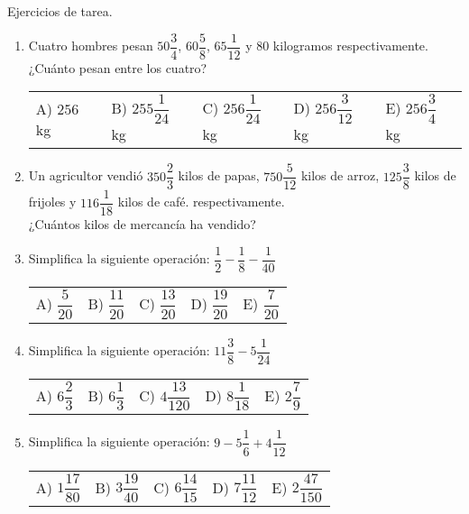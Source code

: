 \newpage

Ejercicios de tarea.

\begin{enumerate}
\item Cuatro hombres pesan $50 \dfrac{3}{4}$, $60 \dfrac{5}{8}$, $65 \dfrac{1}{12}$ y $80$ kilogramos respectivamente.
\\
¿Cuánto pesan entre los cuatro?
\begin{table}[H]
\large
\begin{tabular}{p{2.5cm} p{2.75cm} p{2.75cm} p{2.75cm} p{2.75cm}}
A) $256$ kg & B) $255 \dfrac{1}{24}$ kg & C) $256 \dfrac{1}{24}$ kg & D) $256 \dfrac{3}{12}$ kg & E) $256 \dfrac{3}{4}$ kg \\
\end{tabular}
\end{table}
\item Un agricultor vendió  $350 \dfrac{2}{3}$ kilos de papas, $750 \dfrac{5}{12}$ kilos de arroz, $125 \dfrac{3}{8}$ kilos de frijoles y $116 \dfrac{1}{18}$ kilos de café. respectivamente.
\\
¿Cuántos kilos de mercancía ha vendido?
\item Simplifica la siguiente operación: $\dfrac{1}{2} - \dfrac{1}{8} - \dfrac{1}{40}$
\begin{table}[H]
\large
\begin{tabular}{p{2.5cm} p{2.75cm} p{2.75cm} p{2.75cm} p{2.75cm}}
A) $\dfrac{5}{20}$ & B) $\dfrac{11}{20}$ & C) $\dfrac{13}{20}$ & D) $\dfrac{19}{20}$ & E) $ \dfrac{7}{20}$ \\
\end{tabular}
\end{table}
\item Simplifica la siguiente operación: $11 \dfrac{3}{8} - 5 \dfrac{1}{24}$
\begin{table}[H]
\large
\begin{tabular}{p{2.5cm} p{2.75cm} p{2.75cm} p{2.75cm} p{2.75cm}}
A) $6 \dfrac{2}{3}$ & B) $6 \dfrac{1}{3}$ & C) $4 \dfrac{13}{120}$ & D) $8 \dfrac{1}{18}$ & E) $2 \dfrac{7}{9}$ \\
\end{tabular}
\end{table}
\item Simplifica la siguiente operación: $9 - 5 \dfrac{1}{6} + 4 \dfrac{1}{12}$
\begin{table}[H]
\large
\begin{tabular}{p{2.5cm} p{2.75cm} p{2.75cm} p{2.75cm} p{2.75cm}}
A) $1 \dfrac{17}{80}$ & B) $3 \dfrac{19}{40}$ & C) $6 \dfrac{14}{15}$ & D) $7 \dfrac{11}{12}$ & E) $2 \dfrac{47}{150}$ \\
\end{tabular}
\end{table}
\end{enumerate}
